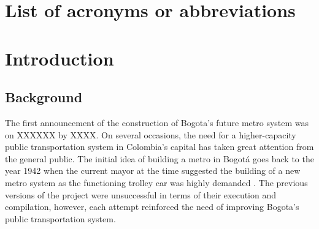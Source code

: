 \documentclass[12pt, a4paper]{report}
\begin{document}
\chapter*{List of acronyms or abbreviations}
\begin{sortedlist} %
  \end{sortedlist}
%
%
%
%
%
%
%
\chapter{Introduction} \label{Chap1}

\section{Background}

The first announcement of the construction of Bogota's future metro system was on XXXXXX by XXXX. On several occasions, the need for a higher-capacity public transportation system in Colombia's capital has taken great attention from the general public. The initial idea of building a metro in Bogot\'{a} goes back to the year 1942 when the current mayor at the time suggested the building of a new metro system as the functioning trolley car was highly demanded \citep{metrodebogotaHistoriaMetroBogota2011}. The previous versions of the project were unsuccessful in terms of their execution and compilation, however, each attempt reinforced the need of improving Bogota's public transportation system.
\end{document}
